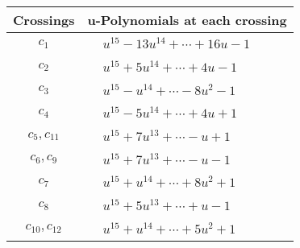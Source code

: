 \documentclass[1p]{elsarticle_modified}
\theoremstyle{definition}
\begin{document}
\begin{tabular}{m{50pt}|m{274pt}}
Crossings & \hspace{64pt}u-Polynomials at each crossing \\
\hline $$\begin{aligned}c_{1}\end{aligned}$$&$\begin{aligned}
&u^{15}-13 u^{14}+\cdots+16 u-1
\end{aligned}$\\
\hline $$\begin{aligned}c_{2}\end{aligned}$$&$\begin{aligned}
&u^{15}+5 u^{14}+\cdots+4 u-1
\end{aligned}$\\
\hline $$\begin{aligned}c_{3}\end{aligned}$$&$\begin{aligned}
&u^{15}- u^{14}+\cdots-8 u^2-1
\end{aligned}$\\
\hline $$\begin{aligned}c_{4}\end{aligned}$$&$\begin{aligned}
&u^{15}-5 u^{14}+\cdots+4 u+1
\end{aligned}$\\
\hline $$\begin{aligned}c_{5},c_{11}\end{aligned}$$&$\begin{aligned}
&u^{15}+7 u^{13}+\cdots- u+1
\end{aligned}$\\
\hline $$\begin{aligned}c_{6},c_{9}\end{aligned}$$&$\begin{aligned}
&u^{15}+7 u^{13}+\cdots- u-1
\end{aligned}$\\
\hline $$\begin{aligned}c_{7}\end{aligned}$$&$\begin{aligned}
&u^{15}+u^{14}+\cdots+8 u^2+1
\end{aligned}$\\
\hline $$\begin{aligned}c_{8}\end{aligned}$$&$\begin{aligned}
&u^{15}+5 u^{13}+\cdots+u-1
\end{aligned}$\\
\hline $$\begin{aligned}c_{10},c_{12}\end{aligned}$$&$\begin{aligned}
&u^{15}+u^{14}+\cdots+5 u^2+1
\end{aligned}$\\
\hline
\end{tabular}\\~\\
\end{document}
